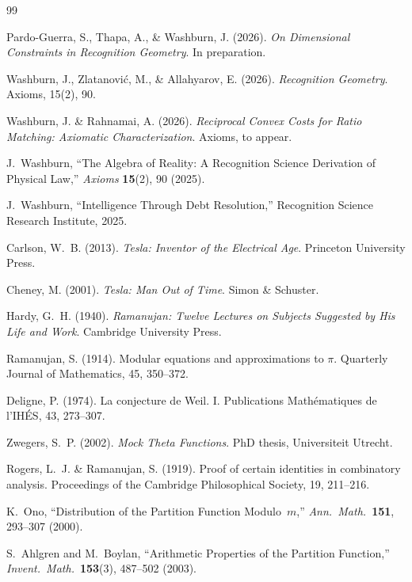 \documentclass[11pt]{article}
\theoremstyle{plain}
\theoremstyle{definition}
\theoremstyle{remark}
\begin{document}
\begin{thebibliography}{99}

Pardo-Guerra, S., Thapa, A., \& Washburn, J. (2026).
\textit{On Dimensional Constraints in Recognition Geometry}.
In preparation.

Washburn, J., Zlatanovi\'c, M., \& Allahyarov, E. (2026).
\textit{Recognition Geometry}.
Axioms, 15(2), 90.

Washburn, J. \& Rahnamai, A. (2026).
\textit{Reciprocal Convex Costs for Ratio Matching: Axiomatic Characterization}.
Axioms, to appear.

J.~Washburn,
``The Algebra of Reality: A Recognition Science Derivation of Physical Law,''
\emph{Axioms} \textbf{15}(2), 90 (2025).

J.~Washburn,
``Intelligence Through Debt Resolution,''
Recognition Science Research Institute, 2025.

Carlson, W.~B. (2013).
\textit{Tesla: Inventor of the Electrical Age}.
Princeton University Press.

Cheney, M. (2001).
\textit{Tesla: Man Out of Time}.
Simon \& Schuster.

Hardy, G.~H. (1940).
\textit{Ramanujan: Twelve Lectures on Subjects Suggested by His Life and Work}.
Cambridge University Press.

Ramanujan, S. (1914).
Modular equations and approximations to $\pi$.
Quarterly Journal of Mathematics, 45, 350--372.

Deligne, P. (1974).
La conjecture de Weil. I.
Publications Math\'ematiques de l'IH\'ES, 43, 273--307.

Zwegers, S.~P. (2002).
\textit{Mock Theta Functions}.
PhD thesis, Universiteit Utrecht.

Rogers, L.~J. \& Ramanujan, S. (1919).
Proof of certain identities in combinatory analysis.
Proceedings of the Cambridge Philosophical Society, 19, 211--216.

K.~Ono,
``Distribution of the Partition Function Modulo~$m$,''
\emph{Ann.\ Math.}\ \textbf{151}, 293--307 (2000).

S.~Ahlgren and M.~Boylan,
``Arithmetic Properties of the Partition Function,''
\emph{Invent.\ Math.}\ \textbf{153}(3), 487--502 (2003).

\end{thebibliography}
\end{document}
